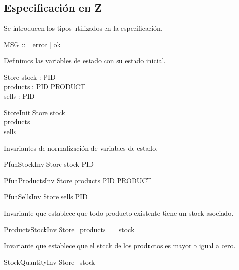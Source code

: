 \documentclass[fleqn,colorlinks,linkcolor=blue,citecolor=blue,urlcolor=blue]{article}
\begin{document}
\subsection{Especificación en Z}

Se introducen los tipos utilizados en la especificación.

\begin{zed}
\also
MSG ::= error | ok
\end{zed}

Definimos las variables de estado con su estado inicial.

\begin{schema}{Store}
stock : PID \rel \nat \\
products : PID \rel PRODUCT \\
sells : PID \rel \seq \nat
\end{schema}

\begin{schema}{StoreInit}
Store
\where
stock = \emptyset \\
products = \emptyset \\
sells = \emptyset
\end{schema}

Invariantes de normalización de variables de estado.

\begin{schema}{PfunStockInv}
Store
\where
stock \in PID \pfun \nat
\end{schema}

\begin{schema}{PfunProductsInv}
Store
\where
products \in PID \pfun PRODUCT
\end{schema}

\begin{schema}{PfunSellsInv}
Store
\where
sells \in PID \pfun \seq \nat
\end{schema}

Invariante que establece que todo producto existente tiene un stock asociado.

\begin{schema}{ProductsStockInv}
Store
\where
\dom~products = \dom~stock
\end{schema}

Invariante que establece que el stock de los productos es mayor o igual a cero.

\begin{schema}{StockQuantityInv}
Store
\where
\ran~stock \subseteq \nat
\end{schema}
\end{document}
